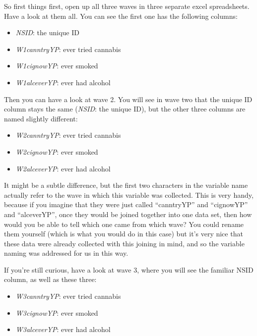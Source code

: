 \documentclass[]{book}
\providecommand{\tightlist}{%
  \setlength{\itemsep}{0pt}\setlength{\parskip}{0pt}}
\theoremstyle{definition}
\theoremstyle{definition}
\theoremstyle{definition}
\theoremstyle{remark}
\begin{document}
So first things first, open up all three waves in three separate excel
spreadsheets. Have a look at them all. You can see the first one has the
following columns:

\begin{itemize}
\tightlist
\item
  \emph{NSID}: the unique ID
\item
  \emph{W1canntryYP}: ever tried cannabis\\
\item
  \emph{W1cignowYP}: ever smoked
\item
  \emph{W1alceverYP}: ever had alcohol
\end{itemize}

Then you can have a look at wave 2. You will see in wave two that the
unique ID column stays the same (\emph{NSID}: the unique ID), but the
other three columns are named slightly different:

\begin{itemize}
\tightlist
\item
  \emph{W2canntryYP}: ever tried cannabis\\
\item
  \emph{W2cignowYP}: ever smoked
\item
  \emph{W2alceverYP}: ever had alcohol
\end{itemize}

It might be a subtle difference, but the first two characters in the
variable name actually refer to the wave in which this variable was
collected. This is very handy, because if you imagine that they were
just called ``canntryYP'' and ``cignowYP'' and ``alceverYP'', once they
would be joined together into one data set, then how would you be able
to tell which one came from which wave? You could rename them yourself
(which is what you would do in this case) but it's very nice that these
data were already collected with this joining in mind, and so the
variable naming was addressed for us in this way.

If you're still curious, have a look at wave 3, where you will see the
familiar NSID column, as well as these three:

\begin{itemize}
\tightlist
\item
  \emph{W3canntryYP}: ever tried cannabis\\
\item
  \emph{W3cignowYP}: ever smoked
\item
  \emph{W3alceverYP}: ever had alcohol
\end{itemize}
\end{document}
